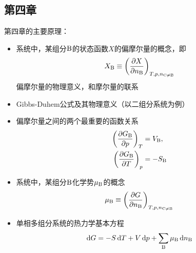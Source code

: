 \documentclass[9pt]{beamer}
\newcommand\B{{\rm B}}
\newcommand\C{{\rm C}}
\newcommand*{\dif}{\mathop{}\!\mathrm{d}}
\begin{document}
	\subsection{第四章}
	\begin{frame}
	
	第四章的主要原理：
	\begin{itemize}
	
	\item 系统中，某组分$\B$的状态函数$X$的偏摩尔量的概念，即
	\[
		X_\B \equiv \left( \frac{ \partial X }{ \partial n_\B } \right)_{T,p,n_{\C\neq \B}}
	\]	
	偏摩尔量的物理意义，和摩尔量的联系
	\item Gibbs-Duhem公式及其物理意义（以二组分系统为例）
	
	\item 偏摩尔量之间的两个最重要的函数关系
	\begin{align*}
	\left( \frac{ \partial G_\B }{ \partial p } \right)_T &= V_\B,\\
	\left( \frac{ \partial G_\B }{ \partial T } \right)_p &= -S_\B
	\end{align*}
	
	\item 系统中，某组分$\B$化学势$\mu_\B$的概念
	\[
		\mu_\B \equiv \left( \frac{ \partial G }{ \partial n_\B } \right)_{T,p,n_{\C\neq \B}}
	\]
	
	\item 单相多组分系统的热力学基本方程
	\[
		\dif G = - S \dif T + V \dif p + \sum_\B \mu_\B \dif n_\B
	\]
	
	\end{itemize}
	
	\end{frame}
	
\end{document}

